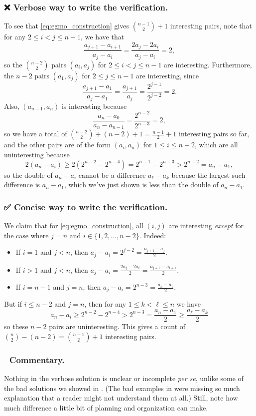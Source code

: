 \documentclass[11pt]{scrartcl}
\begin{document}
\subsubsection*{❌ Verbose way to write the verification.}
To see that \eqref{eq:egmo_construction} gives $\binom{n-1}{2}+1$ interesting pairs,
note that for any $2 \leq i < j \leq n-1$, we have that
\[ \frac{a_{j+1} - a_{i+1}}{a_j - a_i} = \frac{2a_j-2a_i}{a_j-a_i} = 2, \]
so the $\binom{n-2}{2}$ pairs $(a_i, a_j)$ for $2\leq i<j \leq n-1$ are interesting.
Furthermore, the $n-2$ pairs $(a_1, a_j)$ for $2\leq j\leq n-1$ are interesting, since
\[ \frac{a_{j+1} - a_1}{a_j-a_1} = \frac{a_{j+1}}{a_j} = \frac{2^{j-1}}{2^{j-2}} = 2. \]
Also, $(a_{n-1}, a_n)$ is interesting because
\[ \frac{a_n-a_0}{a_n - a_{n-1}} = \frac{2^{n-2}}{2^{n-3}} = 2, \]
so we have a total of $\binom{n-2}{2} + (n-2) + 1 = \frac{n-1}{2} + 1$ interesting pairs so far,
and the other pairs are of the form $(a_i, a_n)$ for $1\leq i\leq n-2$,
which are all uninteresting because
\[ 2(a_n - a_i) \geq  2(2^{n-2} - 2^{n-4}) = 2^{n-1} - 2^{n-3} > 2^{n-2} = a_n - a_1, \]
so the double of $a_n-a_i$ cannot be a difference $a_\ell-a_k$
because the largest such difference is $a_n-a_1$, which we've just shown is
less than the double of $a_n-a_1$.

\subsubsection*{✅ Concise way to write the verification.}
We claim that for \eqref{eq:egmo_construction},
all $(i,j)$ are interesting \emph{except} for the case where $j = n$ and $i \in \{1,2,\dots,n-2\}$.
Indeed:
\begin{itemize}
  \item If $i=1$ and $j<n$, then $a_j - a_i = 2^{j-2} = \frac{a_{j+1}-a_j}{2}$.
  \item If $i>1$ and $j<n$, then $a_j - a_i = \frac{2a_j-2a_i}{2} = \frac{a_{j+1}-a_{i+1}}{2}$.
  \item If $i=n-1$ and $j=n$, then $a_j - a_i = 2^{n-3} = \frac{a_n - a_1}{2}$.
\end{itemize}
But if $i \le n-2$ and $j=n$, then for any $1 \le k < \ell \le n$ we have
\[ a_n - a_i \geq 2^{n-2} - 2^{n-4} > 2^{n-3} = \frac{a_n - a_1}{2}
  \ge \frac{a_\ell - a_k}{2} \]
so these $n-2$ pairs are uninteresting.
This gives a count of $\binom{n}{2} - (n-2) = \binom{n-1}{2}+1$ interesting pairs.

\subsubsection*{💬 Commentary.}
Nothing in the verbose solution is unclear or incomplete \emph{per se},
unlike some of the bad solutions we showed in .
(The bad examples in  were missing so much explanation
that a reader might not understand them at all.)
Still, note how much difference a little bit of planning and organization can make.
\end{document}
